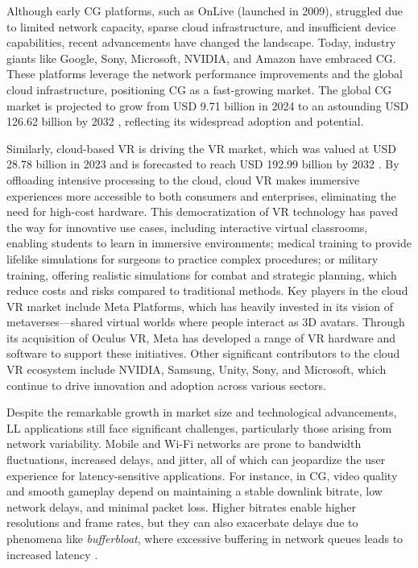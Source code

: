 Although early \ac{CG} platforms, such as OnLive (launched in 2009), struggled due to limited network capacity, sparse cloud infrastructure, and insufficient device capabilities, recent advancements have changed the landscape. Today, industry giants like Google, Sony, Microsoft, NVIDIA, and Amazon have embraced \ac{CG}. These platforms leverage the network performance improvements and the global cloud infrastructure, positioning \ac{CG} as a fast-growing market. The global \ac{CG} market is projected to grow from USD 9.71 billion in 2024 to an astounding USD 126.62 billion by 2032 \cite{fortunebusinessinsightsCloudGaming}, reflecting its widespread adoption and potential.

Similarly, cloud-based \ac{VR} is driving the \ac{VR} market, which was valued at USD 28.78 billion in 2023 and is forecasted to reach USD 192.99 billion by 2032 \cite{nextmscVirtualReality}. By offloading intensive processing to the cloud, cloud \ac{VR} makes immersive experiences more accessible to both consumers and enterprises, eliminating the need for high-cost hardware. This democratization of \ac{VR} technology has paved the way for innovative use cases, including interactive virtual classrooms, enabling students to learn in immersive environments; medical training to provide lifelike simulations for surgeons to practice complex procedures; or military training, offering realistic simulations for combat and strategic planning, which reduce costs and risks compared to traditional methods.
Key players in the cloud \ac{VR} market include Meta Platforms, which has heavily invested in its vision of metaverses—shared virtual worlds where people interact as 3D avatars. Through its acquisition of Oculus \ac{VR}, Meta has developed a range of \ac{VR} hardware and software to support these initiatives. Other significant contributors to the cloud \ac{VR} ecosystem include NVIDIA, Samsung, Unity, Sony, and Microsoft, which continue to drive innovation and adoption across various sectors.

Despite the remarkable growth in market size and technological advancements, \ac{LL} applications still face significant challenges, particularly those arising from network variability. Mobile and Wi-Fi networks are prone to bandwidth fluctuations, increased delays, and jitter, all of which can jeopardize the user experience for latency-sensitive applications. For instance, in \ac{CG}, video quality and smooth gameplay depend on maintaining a stable downlink bitrate, low network delays, and minimal packet loss. Higher bitrates enable higher resolutions and frame rates, but they can also exacerbate delays due to phenomena like \textit{bufferbloat}, where excessive buffering in network queues leads to increased latency \cite{ronteix2022reduction}.

